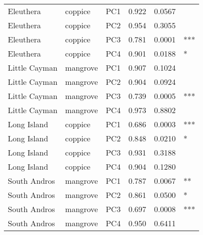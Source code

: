 \begin{tabular}{lllrrl}
Eleuthera & coppice & PC1 & 0.922 & 0.0567 & \\
Eleuthera & coppice & PC2 & 0.954 & 0.3055 & \\
\addlinespace
Eleuthera & coppice & PC3 & 0.781 & 0.0001 & ***\\
Eleuthera & coppice & PC4 & 0.901 & 0.0188 & *\\
Little Cayman & mangrove & PC1 & 0.907 & 0.1024 & \\
Little Cayman & mangrove & PC2 & 0.904 & 0.0924 & \\
Little Cayman & mangrove & PC3 & 0.739 & 0.0005 & ***\\
\addlinespace
Little Cayman & mangrove & PC4 & 0.973 & 0.8802 & \\
Long Island & coppice & PC1 & 0.686 & 0.0003 & ***\\
Long Island & coppice & PC2 & 0.848 & 0.0210 & *\\
Long Island & coppice & PC3 & 0.931 & 0.3188 & \\
Long Island & coppice & PC4 & 0.904 & 0.1280 & \\
\addlinespace
South Andros & mangrove & PC1 & 0.787 & 0.0067 & **\\
South Andros & mangrove & PC2 & 0.861 & 0.0500 & *\\
South Andros & mangrove & PC3 & 0.697 & 0.0008 & ***\\
South Andros & mangrove & PC4 & 0.950 & 0.6411 & \\
\bottomrule
\end{tabular}
